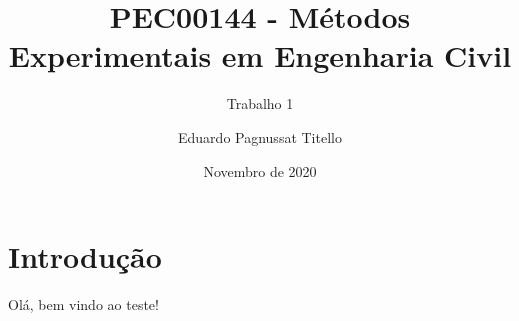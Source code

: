 

\author{Eduardo Pagnussat Titello}
\title{PEC00144 - Métodos Experimentais em Engenharia Civil}
\subtitle{Trabalho 1}
\date{Novembro de 2020}


\maketitle

\section{Introdução}
Olá, bem vindo ao teste!

